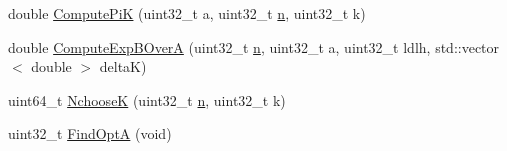\begin{DoxyCompactItemize}
\item 
double \hyperlink{classns3_1_1UanMacRcGw_ab5e169844c40817b3f4654caac633ef5}{Compute\+PiK} (uint32\+\_\+t a, uint32\+\_\+t \hyperlink{lte__link__budget__x2__handover__measures_8m_abdb05bc5a064cf642a06c83b3392f148}{n}, uint32\+\_\+t k)
\item 
double \hyperlink{classns3_1_1UanMacRcGw_ae6060c6de55e408f0dbacefa3595388c}{Compute\+Exp\+B\+OverA} (uint32\+\_\+t \hyperlink{lte__link__budget__x2__handover__measures_8m_abdb05bc5a064cf642a06c83b3392f148}{n}, uint32\+\_\+t a, uint32\+\_\+t ldlh, std\+::vector$<$ double $>$ deltaK)
\item 
uint64\+\_\+t \hyperlink{classns3_1_1UanMacRcGw_a8175312ac53cbda5b11e89c0864a4a35}{NchooseK} (uint32\+\_\+t \hyperlink{lte__link__budget__x2__handover__measures_8m_abdb05bc5a064cf642a06c83b3392f148}{n}, uint32\+\_\+t k)
\item 
uint32\+\_\+t \hyperlink{classns3_1_1UanMacRcGw_acf37aa19bb4293829fec2ff254c56826}{Find\+OptA} (void)
\end{DoxyCompactItemize}
